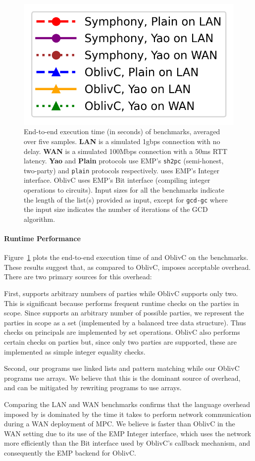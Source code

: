 \begin{figure}
\includegraphics[width=.265\linewidth,align=t]{../figures/legend.png}
\caption{%
  End-to-end execution time (in seconds) of benchmarks, averaged over five samples.
  \textbf{LAN} is a simulated 1gbps connection with no delay. \textbf{WAN} is a simulated 100Mbps
  connection with a 50ms RTT latency. \textbf{Yao} and \textbf{Plain} protocols use EMP's \texttt{sh2pc}
  (semi-honest, two-party) and \texttt{plain} protocols respectively. \system{} uses EMP's Integer
  interface. OblivC uses EMP's Bit interface (compiling integer operations to circuits).
  Input sizes for all the benchmarks indicate the
  length of the list(s) provided as input, except for \texttt{gcd-gc} where the input size indicates
  the number of iterations of the GCD algorithm.
}\label{fig:mpc-impl-eval-etoe}
\end{figure}

\paragraph{Runtime Performance}

Figure~\ref{fig:mpc-impl-eval-etoe} plots the end-to-end execution time of \system{}
and OblivC on the benchmarks. These results suggest that, as compared to OblivC,
\system imposes acceptable overhead. There are two primary sources for this overhead:

First, \system supports arbitrary numbers of parties while OblivC supports only two.
      This is significant because \system performs frequent runtime checks on the parties in scope.
      Since \system supports an arbitrary number of possible parties, we
      represent the parties in scope as a set (implemented by a balanced tree
      data structure).
      Thus checks on principals are implemented by set operations.
      OblivC also performs certain checks on parties but, since only two
      parties are supported, these are implemented as simple integer equality
      checks.

Second, our \system programs use linked lists and pattern matching while our
OblivC programs use arrays.  We believe that this is the dominant source of
overhead, and can be mitigated by rewriting \system programs to use arrays.

Comparing the LAN and WAN benchmarks confirms that the language overhead imposed by \system{} is dominated by
the time it takes to perform network communication during a WAN deployment of MPC. We believe \system{} is faster than OblivC in the WAN setting
due to its use of the EMP Integer interface, which uses the network
more efficiently than the Bit interface used by OblivC's callback
mechanism, and consequently the EMP backend for OblivC.

